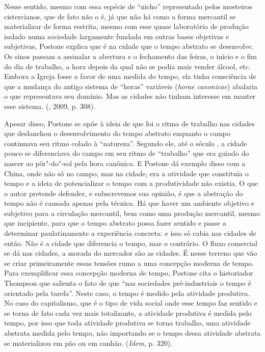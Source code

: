 Nesse sentido, mesmo com essa espécie de ``nicho'' representado pelos
mosteiros cistercianos, que de fato não o é, já que não há como a forma
mercantil se materializar de forma restrita, mesmo com esse quase
laboratório de produção isolado numa sociedade largamente fundada em
outras bases objetivas e subjetivas, Postone explica que é na cidade que
o tempo abstrato se desenvolve. Os sinos passam a assinalar a abertura e
o fechamento das feiras, o início e o fim do dia de trabalho, a hora
depois da qual não se podia mais vender álcool, etc. Embora a Igreja
fosse a favor de uma medida do tempo, ela tinha consciência de que a
mudança do antigo sistema de ``horas'' variáveis (\emph{horae}
\emph{canonicae}) abalaria o que representava seu domínio. Mas as
cidades não tinham interesse em manter esse sistema. (, 2009, p.
308).

Apesar disso, Postone se opõe à ideia de que foi o ritmo de trabalho nas
cidades que deslanchou o desenvolvimento do tempo abstrato enquanto o
campo continuava seu ritmo colado à ``natureza''. Segundo ele, até o
século , a cidade pouco se diferenciava do campo em seu ritmo de
``trabalho'' que era guiado do nascer ao pôr"-do"-sol pela hora canônica.
E Postone dá exemplo disso com a China, onde não só no campo, mas na
cidade, era a atividade que constituía o tempo e a ideia de
potencializar o tempo com a produtividade não existia. O que o autor
pretende defender, e subscrevemos sua opinião, é que a abstração do
tempo não é causada apenas pela técnica. Há que haver um ambiente
objetivo e subjetivo para a circulação mercantil, bem como uma produção
mercantil, mesmo que incipiente, para que o tempo abstrato possa fazer
sentido e passe a determinar paulatinamente a experiência concreta: e
isso só cabia nas cidades de então. Não é a cidade que diferencia o
tempo, mas o contrário. O fluxo comercial se dá nas cidades, a morada do
mercador são as cidades. É nesse terreno que vão se criar primeiramente
essas tensões rumo a uma concepção moderna de tempo. Para exemplificar
essa concepção moderna de tempo, Postone cita o historiador Thompson que
salienta o fato de que ``nas sociedades pré-industriais o tempo é
orientado pela tarefa''. Neste caso, o tempo é medido pela atividade
produtiva. No caso do capitalismo, que é o tipo de vida social onde esse
tempo faz sentido e se torna de fato cada vez mais totalizante, a
atividade produtiva é medida pelo tempo, por isso que toda atividade
produtiva se torna trabalho, uma atividade abstrata medida pelo tempo,
não importando se o tempo dessa atividade abstrata se materializou em
pão ou em canhão. (\emph{Idem}, p. 320).

